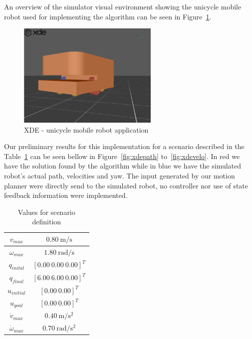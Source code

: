 An overview of the simulator visual environment showing the unicycle mobile robot used for implementing the algorithm can be seen in Figure~\ref{fig:xde}.
\begin{figure}[H]
	\centering
	\includegraphics[width=0.6\textwidth]{./images/xde4.png}
	\caption{XDE - unicycle mobile robot application\label{fig:xde}}
\end{figure}

Our preliminary results for this implementation for a scenario described in the Table~\ref{tab:xdesimin} can be seen bellow in Figure~\ref{fig:xdepath} to~\ref{fig:xdevelo}. In red we have the solution found by the algorithm while in blue we have the simulated robot's actual path, velocities and yaw. The input generated by our motion planner were directly send to the simulated robot, no controller nor use of state feedback information were implemented.

\begin{table}[H]
\caption {Values for scenario definition} \label{tab:xdesimin}
\begin{center}
\begin{tabular}{|c|c|}
\hline
$v_{max}$ & $0.80\ \mathrm{m/s}$\\
\hline
$\omega_{max}$ & $1.80\ \mathrm{rad/s}$\\
\hline
$q_{inital}$ & $[0.00\ 0.00\ 0.00]^T$\\
\hline
$q_{final}$ & $[6.00\ 6.00\ 0.00]^T$\\
\hline
$u_{initial}$ & $[0.00\ 0.00]^T$\\
\hline
$u_{goal}$ & $[0.00\ 0.00]^T$\\
\hline
$\dot{v}_{max}$ & $0.40\ \mathrm{m/s^2}$\\
\hline
$\dot{\omega}_{max}$ & $0.70\ \mathrm{rad/s^2}$\\
\hline
\end{tabular}
\end{center}
\end{table}


